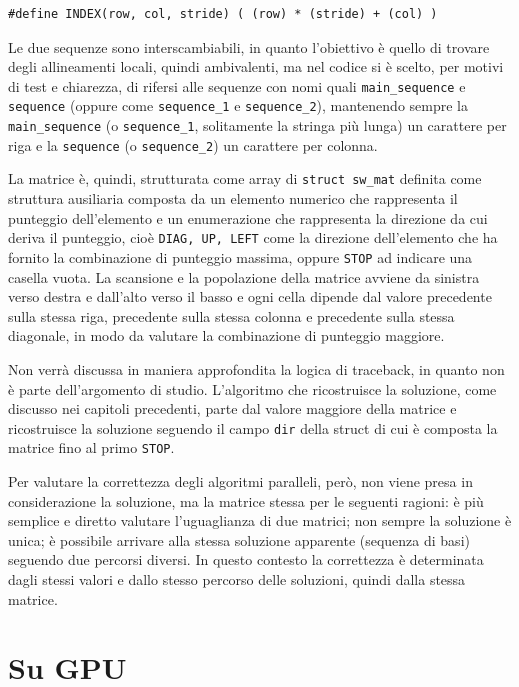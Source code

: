 \documentclass[a4paper,12pt]{article}
\begin{document}
\begin{lstlisting}
#define INDEX(row, col, stride) ( (row) * (stride) + (col) )
\end{lstlisting}

Le due sequenze sono interscambiabili, in quanto l'obiettivo è quello di trovare degli allineamenti locali, quindi ambivalenti, ma nel codice si è scelto, per motivi di test e chiarezza, di rifersi alle sequenze con nomi quali \texttt{main\_sequence} e \texttt{sequence} (oppure come \texttt{sequence\_1} e \texttt{sequence\_2}), mantenendo sempre la \texttt{main\_sequence} (o \texttt{sequence\_1}, solitamente la stringa più lunga) un carattere per riga e la \texttt{sequence} (o \texttt{sequence\_2}) un carattere per colonna.

La matrice è, quindi, strutturata come array di \texttt{struct sw\_mat} definita come struttura ausiliaria composta da un elemento numerico che rappresenta il punteggio dell'elemento e un enumerazione che rappresenta la direzione da cui deriva il punteggio, cioè \texttt{DIAG, UP, LEFT} come la direzione dell'elemento che ha fornito la combinazione di punteggio massima, oppure \texttt{STOP} ad indicare una casella vuota. La scansione e la popolazione della matrice avviene da sinistra verso destra e dall'alto verso il basso e ogni cella dipende dal valore precedente sulla stessa riga, precedente sulla stessa colonna e precedente sulla stessa diagonale, in modo da valutare la combinazione di punteggio maggiore.

Non verrà discussa in maniera approfondita la logica di traceback, in quanto non è parte dell'argomento di studio. L'algoritmo che ricostruisce la soluzione, come discusso nei capitoli precedenti, parte dal valore maggiore della matrice e ricostruisce la soluzione seguendo il campo \texttt{dir} della struct di cui è composta la matrice fino al primo \texttt{STOP}.

Per valutare la correttezza degli algoritmi paralleli, però, non viene presa in considerazione la soluzione, ma la matrice stessa per le seguenti ragioni: è più semplice e diretto valutare l'uguaglianza di due matrici; non sempre la soluzione è unica; è possibile arrivare alla stessa soluzione apparente (sequenza di basi) seguendo due percorsi diversi.
In questo contesto la correttezza è determinata dagli stessi valori e dallo stesso percorso delle soluzioni, quindi dalla stessa matrice.

\section{Su GPU}
\end{document}
